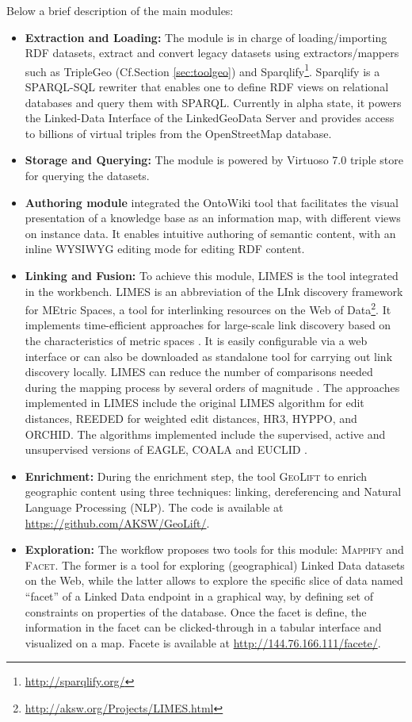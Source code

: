 Below a brief description of the main modules:
\begin{itemize}
\item \textbf{Extraction and Loading:} The module is in charge of loading/importing RDF datasets, extract and convert legacy datasets using extractors/mappers such as TripleGeo (Cf.Section \ref{sec:toolgeo}) and Sparqlify\footnote{\url{http://sparqlify.org/}}. Sparqlify is a SPARQL-SQL rewriter that enables one to define RDF views on relational databases and query them with SPARQL. Currently in alpha state, it powers the Linked-Data Interface of the LinkedGeoData Server and provides access to billions of virtual triples from the OpenStreetMap database.
\item \textbf{Storage and Querying:} The module is powered by Virtuoso 7.0 triple store for querying the datasets.
\item \textbf{Authoring module} integrated the OntoWiki tool \cite{ontowiki14} that facilitates the visual presentation of a knowledge base as an information map, with different views on instance data. It enables intuitive authoring of semantic content, with an inline WYSIWYG editing mode for editing RDF content.

\item \textbf{Linking and Fusion:} To achieve this module, LIMES is the tool integrated in the workbench. LIMES is an abbreviation of the LInk discovery framework for MEtric Spaces, a tool for interlinking resources on the Web of Data\footnote{\url{http://aksw.org/Projects/LIMES.html}}. It implements time-efficient approaches for large-scale link discovery based on the characteristics of metric spaces \cite{ngau11}. It is easily configurable via a web interface or can also be downloaded as standalone tool for carrying out link discovery locally. LIMES can reduce the number of comparisons needed during the mapping process by several orders of magnitude \cite{song13}. The approaches implemented in LIMES include the original LIMES algorithm for edit distances, REEDED for weighted edit distances, HR3, HYPPO, and ORCHID. The algorithms implemented  include the supervised, active and unsupervised versions of EAGLE, COALA and EUCLID \cite{ngon13}.

\item \textbf{Enrichment:} During the enrichment step, the tool \textsc{GeoLift} \cite{geolift14} to enrich geographic content using three techniques: linking, dereferencing and Natural Language Processing (NLP). The code is available at \url{https://github.com/AKSW/GeoLift/}.

\item \textbf{Exploration:} The workflow proposes two tools for this module: \textsc{Mappify} and \textsc{Facet}. The former is a tool for exploring (geographical) Linked Data datasets on the Web, while the latter allows  to explore the specific slice of data named ``facet''  of a Linked Data endpoint in a graphical way, by defining set of constraints on properties of the database. Once the facet is define, the information in the facet can be clicked-through in a tabular interface and visualized on a map. Facete is available at \url{http://144.76.166.111/facete/}.
\end{itemize}

